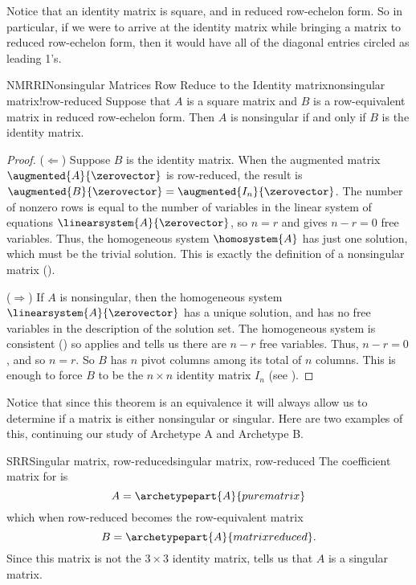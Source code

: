 %
Notice that an identity matrix is square, and in reduced row-echelon form.  So in particular, if we were to arrive at the identity matrix while bringing a matrix to reduced row-echelon form, then it would have all of the diagonal entries circled as leading 1's.
%
\begin{theorem}{NMRRI}{Nonsingular Matrices Row Reduce to the Identity matrix}{nonsingular matrix!row-reduced}
Suppose that $A$ is a square matrix and $B$ is a row-equivalent matrix in reduced row-echelon form.  Then $A$ is nonsingular if and only if $B$ is the identity matrix.
\end{theorem}
%
\begin{proof}
($\Leftarrow$)  Suppose $B$ is the identity matrix.  When the augmented matrix $\augmented{A}{\zerovector}$ is row-reduced, the result is $\augmented{B}{\zerovector}=\augmented{I_n}{\zerovector}$.  The number of nonzero rows is equal to the number of variables in the linear system of equations $\linearsystem{A}{\zerovector}$, so $n=r$ and  gives $n-r=0$ free variables.  Thus, the homogeneous system $\homosystem{A}$ has just one solution, which must be the trivial solution.  This is exactly the definition of a nonsingular matrix ().\par
%
($\Rightarrow$)  If $A$ is nonsingular, then the homogeneous system $\linearsystem{A}{\zerovector}$ has a unique solution, and has no free variables in the description of the solution set.  The homogeneous system is consistent () so   applies and tells us there are $n-r$ free variables.  Thus, $n-r=0$, and so $n=r$.  So $B$ has $n$ pivot columns among its total of $n$ columns.  This is enough to force $B$ to be the $n\times n$ identity matrix $I_n$ (see ).
\end{proof}
%
Notice that since this theorem is an equivalence it will always allow us to determine if a matrix is either nonsingular or singular.  Here are two examples of this, continuing our study of Archetype A and Archetype B.
%
\begin{example}{SRR}{Singular matrix, row-reduced}{singular matrix, row-reduced}
The coefficient matrix for  is
%
\begin{equation*}
A=\archetypepart{A}{purematrix}
\end{equation*}
%
which when row-reduced becomes the row-equivalent matrix
%
\begin{equation*}
B=\archetypepart{A}{matrixreduced}.
\end{equation*}
%
Since this matrix is not the $3\times 3$ identity matrix,  tells us that $A$ is a singular matrix.
\end{example}
